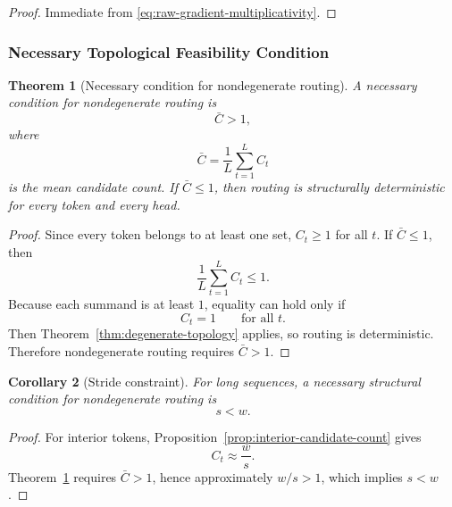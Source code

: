 \documentclass{article}
\theoremstyle{plain}
\newtheorem{theorem}{Theorem}[section]
\newtheorem{corollary}[theorem]{Corollary}
\theoremstyle{definition}
\theoremstyle{remark}
\begin{document}
\begin{proof}
Immediate from \eqref{eq:raw-gradient-multiplicativity}.
\end{proof}

\subsubsection{Necessary Topological Feasibility Condition}
\label{sec:tier-a-feasibility}

\begin{theorem}[Necessary condition for nondegenerate routing]
\label{thm:necessary-feasible-topology}
A necessary condition for nondegenerate routing is
\begin{equation}
\label{eq:necessary-cbar}
\bar{C}>1,
\end{equation}
where
\[
\bar{C}=\frac{1}{L}\sum_{t=1}^{L} C_{t}
\]
is the mean candidate count. If $\bar{C}\le 1$, then routing is structurally deterministic for every token and every head.
\end{theorem}

\begin{proof}
Since every token belongs to at least one set, $C_{t}\ge 1$ for all $t$. If $\bar{C}\le 1$, then
\[
\frac{1}{L}\sum_{t=1}^{L} C_{t}\le 1.
\]
Because each summand is at least $1$, equality can hold only if
\[
C_{t}=1 \qquad \text{for all } t.
\]
Then Theorem~\ref{thm:degenerate-topology} applies, so routing is deterministic. Therefore nondegenerate routing requires $\bar{C}>1$.
\end{proof}

\begin{corollary}[Stride constraint]
\label{cor:stride-less-than-window}
For long sequences, a necessary structural condition for nondegenerate routing is
\begin{equation}
\label{eq:stride-less-than-window}
s<w.
\end{equation}
\end{corollary}

\begin{proof}
For interior tokens, Proposition~\ref{prop:interior-candidate-count} gives
\[
C_{t}\approx \frac{w}{s}.
\]
Theorem~\ref{thm:necessary-feasible-topology} requires $\bar{C}>1$, hence approximately $w/s>1$, which implies $s<w$.
\end{proof}

\end{document}

